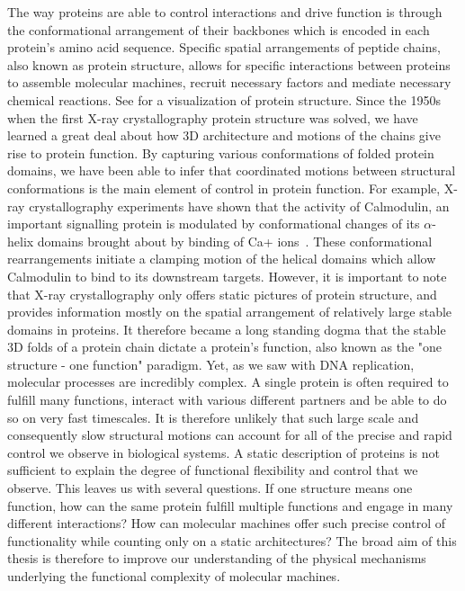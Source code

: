 The way proteins are able to control interactions and drive function is through the conformational arrangement of their backbones which is encoded in each protein's amino acid sequence. Specific spatial arrangements of peptide chains, also known as protein structure, allows for specific interactions between proteins to assemble molecular machines, recruit necessary factors and mediate necessary chemical reactions. See  for a visualization of protein structure. Since the 1950s when the first X-ray crystallography protein structure was solved, we have learned a great deal about how 3D architecture and motions of the chains give rise to protein function. By capturing various conformations of folded protein domains, we have been able to infer that coordinated motions between structural conformations is the main element of control in protein function. For example, X-ray crystallography experiments have shown that the activity of Calmodulin, an important signalling protein is modulated by conformational changes of its $\alpha$-helix domains brought about by binding of Ca+ ions~\cite{meador1992target}. These conformational rearrangements initiate a clamping motion of the helical domains which allow Calmodulin to bind to its downstream targets. However, it is important to note that X-ray crystallography only offers static pictures of protein structure, and provides information mostly on the spatial arrangement of relatively large stable domains in proteins. It therefore became a long standing dogma that the stable 3D folds of a protein chain dictate a protein's function, also known as the "one structure - one function" paradigm. Yet, as we saw with DNA replication, molecular processes are incredibly complex. A single protein is often required to fulfill many functions, interact with various different partners and be able to do so on very fast timescales. It is therefore unlikely that such large scale and consequently slow structural motions can account for all of the precise and rapid control we observe in biological systems. A static description of proteins is not sufficient to explain the degree of functional flexibility and control that we observe. This leaves us with several questions. If one structure means one function, how can the same protein fulfill multiple functions and engage in many different interactions? How can molecular machines offer such precise control of functionality while counting only on a static architectures? The broad aim of this thesis is therefore to improve our understanding of the physical mechanisms underlying the functional complexity of molecular machines.

